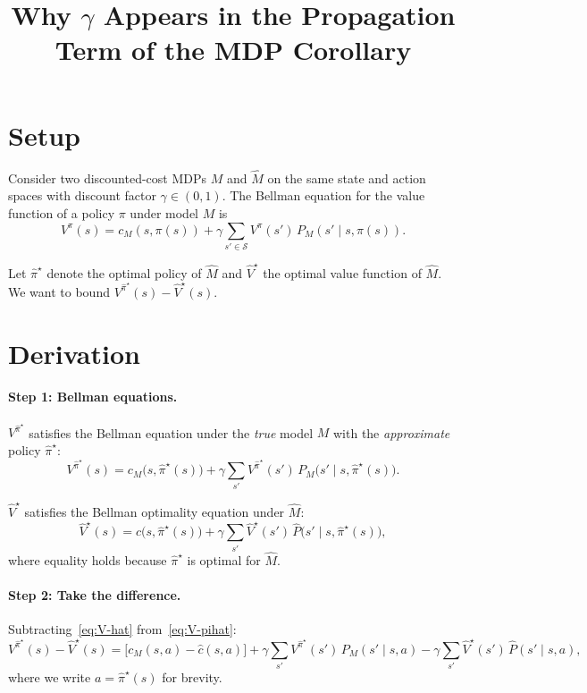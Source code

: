 \documentclass[11pt]{article}
\title{Why $\gamma$ Appears in the Propagation Term of the MDP Corollary}
\author{}
\date{}
\newcommand{\pihatstar}{\hat\pi^\star}
\newcommand{\Vhatstar}{\hat V^\star}
\newcommand{\Vpihat}{V^{\pihatstar}}
\begin{document}
\maketitle

\section{Setup}

Consider two discounted-cost MDPs $M$ and $\hat M$ on the same state and
action spaces with discount factor $\gamma \in (0,1)$.  The Bellman equation
for the value function of a policy $\pi$ under model $M$ is
\begin{equation}\label{eq:bellman}
  V^\pi(s) = c_M(s, \pi(s)) + \gamma \sum_{s' \in \mathcal{S}} V^\pi(s')\, P_M(s' \mid s, \pi(s)).
\end{equation}

Let $\pihatstar$ denote the optimal policy of $\hat M$ and $\Vhatstar$ the
optimal value function of $\hat M$.  We want to bound $\Vpihat(s) - \Vhatstar(s)$.

\section{Derivation}

\paragraph{Step 1: Bellman equations.}
$\Vpihat$ satisfies the Bellman equation under the \emph{true} model $M$
with the \emph{approximate} policy $\pihatstar$:
\begin{equation}\label{eq:V-pihat}
  \Vpihat(s) = c_M\bigl(s, \pihatstar(s)\bigr)
  + \gamma \sum_{s'} \Vpihat(s')\, P_M\bigl(s' \mid s, \pihatstar(s)\bigr).
\end{equation}

$\Vhatstar$ satisfies the Bellman optimality equation under $\hat M$:
\begin{equation}\label{eq:V-hat}
  \Vhatstar(s) = \hat c\bigl(s, \pihatstar(s)\bigr)
  + \gamma \sum_{s'} \Vhatstar(s')\, \hat P\bigl(s' \mid s, \pihatstar(s)\bigr),
\end{equation}
where equality holds because $\pihatstar$ is optimal for $\hat M$.

\paragraph{Step 2: Take the difference.}
Subtracting~\eqref{eq:V-hat} from~\eqref{eq:V-pihat}:
\begin{equation}\label{eq:diff-raw}
  \Vpihat(s) - \Vhatstar(s)
  = \bigl[c_M(s, a) - \hat c(s, a)\bigr]
  + \gamma \sum_{s'} \Vpihat(s')\, P_M(s' \mid s, a)
  - \gamma \sum_{s'} \Vhatstar(s')\, \hat P(s' \mid s, a),
\end{equation}
where we write $a = \pihatstar(s)$ for brevity.
\end{document}
